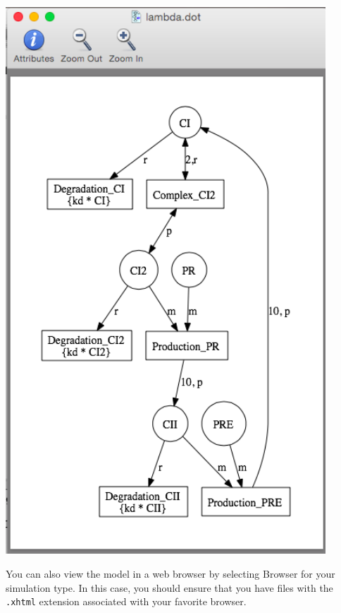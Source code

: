 \documentclass[titlepage,11pt]{article}
\begin{document}
\begin{center}
\includegraphics[width=120mm]{screenshots/viewNetwork}
\end{center}

You can also view the model in a web browser by selecting Browser for your simulation type.  In this case, you should ensure that you have files with the {\tt .xhtml} extension associated with your favorite browser.  
\end{document}
